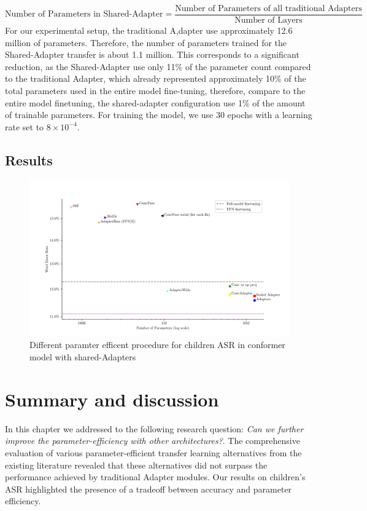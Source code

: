\begin{equation}
    \text{Number of Parameters in Shared-Adapter} = \frac{\text{Number of Parameters of all traditional Adapters}}{\text{Number of Layers}}
\end{equation}
For our experimental setup, the traditional A,dapter use approximately 12.6 million of parameters. Therefore, the number of parameters trained for the Shared-Adapter transfer is about 1.1 million. This corresponds to a significant reduction, as the Shared-Adapter use only 11\% of the parameter count compared to the traditional Adapter, which already represented approximately 10\% of the total parameters used in the entire model fine-tuning, therefore, compare to the entire model finetuning, the shared-adapter configuration use 1\% of the amount of trainable parameters.
For training the model, we use 30 epochs with a learning rate set to $8 \times 10^{-4}$. 

\subsection{Results}

\begin{figure}
    \begin{center}
        \includegraphics[width=\textwidth]{imgs/Adapters_compare.png}
        \caption{Different paramter efficent procedure for children ASR in conformer model with shared-Adapters}
        \label{fig:adapter_compared}
    \end{center}
\end{figure}


\section{Summary and discussion}
In this chapter we addressed to the following research question: \textit{Can we further improve the parameter-efficiency with other architectures?}. The comprehensive evaluation of various parameter-efficient transfer learning alternatives from the existing literature revealed that these alternatives did not surpass the performance achieved by traditional Adapter modules. Our results on children's ASR highlighted the presence of a tradeoff between accuracy and parameter efficiency.

